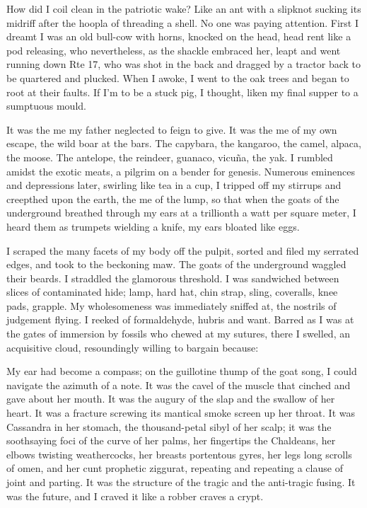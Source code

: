 \documentclass[
]{memoir}
\begin{document}
How did I coil clean in the patriotic wake? Like an ant with a slipknot
sucking its midriff after the hoopla of threading a shell. No one was
paying attention. First I dreamt I was an old bull-cow with horns,
knocked on the head, head rent like a pod releasing, who nevertheless,
as the shackle embraced her, leapt and went running down Rte 17, who was
shot in the back and dragged by a tractor back to be quartered and
plucked. When I awoke, I went to the oak trees and began to root at
their faults. If I'm to be a stuck pig, I thought, liken my final supper
to a sumptuous mould.

It was the me my father neglected to feign to give. It was the me of my
own escape, the wild boar at the bars. The capybara, the kangaroo, the
camel, alpaca, the moose. The antelope, the reindeer, guanaco, vicuña,
the yak. I rumbled amidst the exotic meats, a pilgrim on a bender for
genesis. Numerous eminences and depressions later, swirling like tea in
a cup, I tripped off my stirrups and creepthed upon the earth, the me of
the lump, so that when the goats of the underground breathed through my
ears at a trillionth a watt per square meter, I heard them as trumpets
wielding a knife, my ears bloated like eggs.

I scraped the many facets of my body off the pulpit, sorted and filed my
serrated edges, and took to the beckoning maw. The goats of the
underground waggled their beards. I straddled the glamorous threshold. I
was sandwiched between slices of contaminated hide; lamp, hard hat, chin
strap, sling, coveralls, knee pads, grapple. My wholesomeness was
immediately sniffed at, the nostrils of judgement flying. I reeked of
formaldehyde, hubris and want. Barred as I was at the gates of immersion
by fossils who chewed at my sutures, there I swelled, an acquisitive
cloud, resoundingly willing to bargain because:

My ear had become a compass; on the guillotine thump of the goat song, I
could navigate the azimuth of a note. It was the cavel of the muscle
that cinched and gave about her mouth. It was the augury of the slap and
the swallow of her heart. It was a fracture screwing its mantical smoke
screen up her throat. It was Cassandra in her stomach, the
thousand-petal sibyl of her scalp; it was the soothsaying foci of the
curve of her palms, her fingertips the Chaldeans, her elbows twisting
weathercocks, her breasts portentous gyres, her legs long scrolls of
omen, and her cunt prophetic ziggurat, repeating and repeating a clause
of joint and parting. It was the structure of the tragic and the
anti-tragic fusing. It was the future, and I craved it like a robber
craves a crypt.
\end{document}
